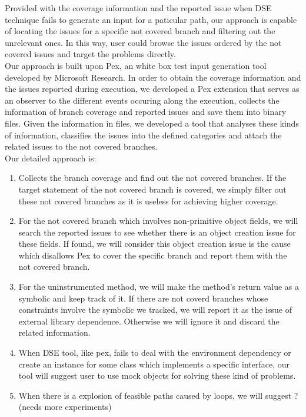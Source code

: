 Provided with the coverage information and the reported issue when DSE technique fails to generate an input for a paticular path, our approach is capable of locating the issues for a specific not covered branch and filtering out the unrelevant ones. In this way, user could browse the issues ordered by the not covered issues and target the problems directly. 
\\Our approach is built upon Pex, an white box test input generation tool developed by Microsoft Research. In order to obtain the coverage information and the issues reported during execution, we developed a Pex extension that serves as an observer to the different events occuring along the execution, collects the information of branch coverage and reported issues and save them into binary files. Given the information in files, we developed a tool that analyses these kinds of information, classifies the issues into the defined categories and attach the related issues to the not covered branches. 
\\Our detailed approach is:
\begin{enumerate}
\item Collects the branch coverage and find out the not covered branches. If the target statement of the not covered branch is covered, we simply filter out these not covered branches as it is useless for achieving higher coverage.
\item For the not covered branch which involves non-primitive object fields, we will search the reported issues to see whether there is an object creation issue for these fields. If found, we will consider this object creation issue is the cause which disallows Pex to cover the specific branch and report them with the not covered branch. 
\item For the uninstrumented method, we will make the method's return value as a symbolic and keep track of it. If there are not coverd branches whose constraints involve the symbolic we tracked, we will report it as the issue of external library dependence. Otherwise we will ignore it and discard the related information.
\item When DSE tool, like pex, fails to deal with the environment dependency or create an instance for some class which implements a specific interface, our tool will suggest user to use mock objects for solving these kind of problems.
\item When there is a explosion of feasible paths caused by loops, we will suggest ? (needs more experiments)
\end{enumerate}

